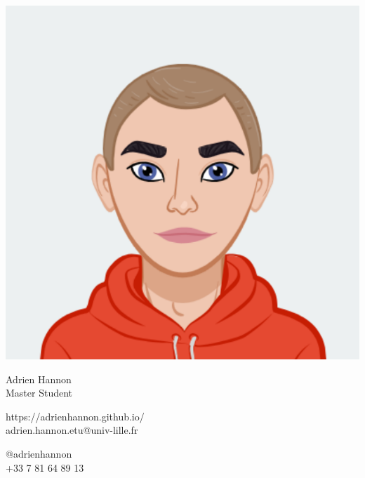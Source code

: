 \documentclass{article}
\begin{document}
\centering \includegraphics[width=.2\linewidth]{logo}\\[5pt]
\parbox{2in}{\Large \centering Adrien Hannon\\[1pt]
\normalsize Master Student}

\vfill
\raggedright
\begin{multicols}{2}
https://adrienhannon.github.io/\\
adrien.hannon.etu@univ-lille.fr

\columnbreak
\raggedleft
@adrienhannon\\
+33 7 81 64 89 13 %
\end{multicols}%
\end{document}
